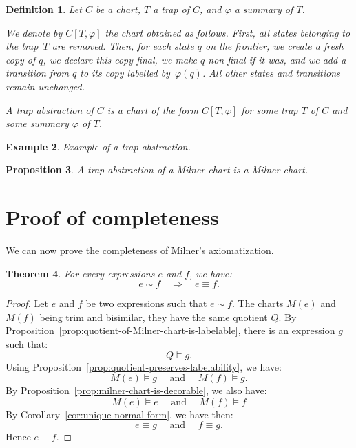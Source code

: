 \documentclass{article}
\newtheorem{definition}{Definition}[section]
\newtheorem{proposition}[definition]{Proposition}
\newtheorem{theorem}[definition]{Theorem}
\newtheorem{example}[definition]{Example}
\begin{document}
\begin{definition}
Let $C$ be a chart, $T$ a trap of $C$, and $\varphi$ a summary of $T$.

We denote by $C[T,\varphi]$ the chart obtained as follows.  
First, all states belonging to the trap~$T$ are removed.  
Then, for each state $q$ on the frontier, we create a fresh copy of $q$, we declare this copy final, we make $q$ non-final if it was, and we add a transition from $q$ to its copy labelled by~$\varphi(q)$.  
All other states and transitions remain unchanged.

A \emph{trap abstraction} of $C$ is a chart of the form $C[T,\varphi]$ for some trap $T$ of $C$ and some summary $\varphi$ of $T$.
\end{definition}

\begin{example} Example of a trap abstraction.
\end{example}

\begin{proposition} A trap abstraction of a Milner chart is a Milner chart.
\end{proposition}

\section{Proof of completeness}



We can now prove the completeness of Milner's axiomatization.

\begin{theorem} For every expressions $e$ and $f$, we have:
  $$ e\sim f \quad \Longrightarrow \quad e\equiv f.$$
\end{theorem}
\begin{proof}
 Let $e$ and $f$ be two expressions such that $e\sim f$. The charts $M(e)$ and $M(f)$ being trim and bisimilar, they have the same quotient $Q$.  By Proposition~\ref{prop:quotient-of-Milner-chart-is-labelable}, there is an expression $g$ such that: $$Q\models g.$$
 Using Proposition~\ref{prop:quotient-preserves-labelability}, we have:
   $$M(e)\models g\quad \text{ and } \quad M(f)\models g.$$
  By Proposition~\ref{prop:milner-chart-is-decorable}, we also  have:
   $$M(e)\models e\quad \text{ and } \quad M(f)\models f$$
  By Corollary~\ref{cor:unique-normal-form}, we have then:
   $$e\equiv g\quad \text{ and } \quad f \equiv g.$$Hence $e\equiv f$.
\end{proof}
\end{document}

